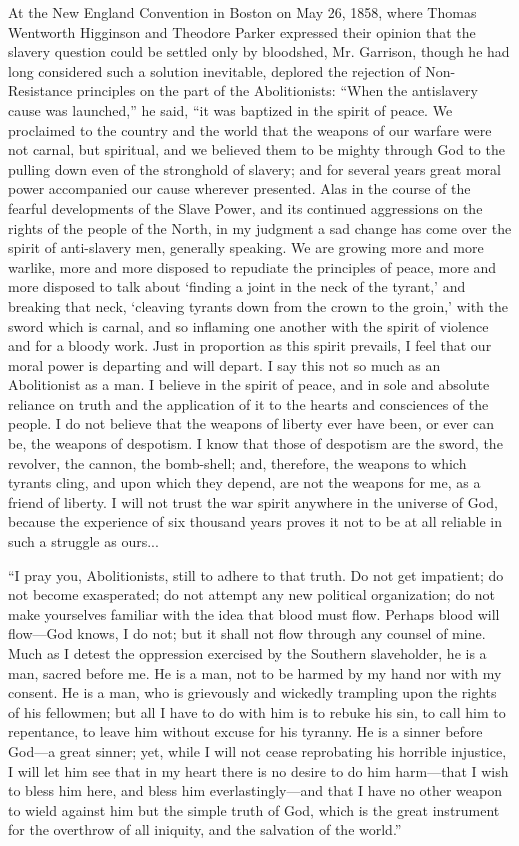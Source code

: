 \documentclass{book}
\begin{document}
At the New England Convention in Boston on May 26, 1858, where Thomas Wentworth Higginson and Theodore Parker expressed their opinion that the slavery question could be settled only by bloodshed, Mr. Garrison, though he had long considered such a solution inevitable, deplored the rejection of Non-Resistance principles on the part of the Abolitionists: “When the antislavery cause was launched,” he said, “it was baptized in the spirit of peace. We proclaimed to the country and the world that the weapons of our warfare were not carnal, but spiritual, and we believed them to be mighty through God to the pulling down even of the stronghold of slavery; and for several years great moral power accompanied our cause wherever presented. Alas in the course of the fearful developments of the Slave Power, and its continued aggressions on the rights of the people of the North, in my judgment a sad change has come over the spirit of anti-slavery men, generally speaking. We are growing more and more warlike, more and more disposed to repudiate the principles of peace, more and more disposed to talk about ‘finding a joint in the neck of the tyrant,’ and breaking that neck, ‘cleaving tyrants down from the crown to the groin,’ with the sword which is carnal, and so inflaming one another with the spirit of violence and for a bloody work. Just in proportion as this spirit prevails, I feel that our moral power is departing and will depart. I say this not so much as an Abolitionist as a man. I believe in the spirit of peace, and in sole and absolute reliance on truth and the application of it to the hearts and consciences of the people. I do not believe that the weapons of liberty ever have been, or ever can be, the weapons of despotism. I know that those of despotism are the sword, the revolver, the cannon, the bomb-shell; and, therefore, the weapons to which tyrants cling, and upon which they depend, are not the weapons for me, as a friend of liberty. I will not trust the war spirit anywhere in the universe of God, because the experience of six thousand years proves it not to be at all reliable in such a struggle as ours...

“I pray you, Abolitionists, still to adhere to that truth. Do not get impatient; do not become exasperated; do not attempt any new political organization; do not make yourselves familiar with the idea that blood must flow. Perhaps blood will flow—God knows, I do not; but it shall not flow through any counsel of mine. Much as I detest the oppression exercised by the Southern slaveholder, he is a man, sacred before me. He is a man, not to be harmed by my hand nor with my consent. He is a man, who is grievously and wickedly trampling upon the rights of his fellowmen; but all I have to do with him is to rebuke his sin, to call him to repentance, to leave him without excuse for his tyranny. He is a sinner before God—a great sinner; yet, while I will not cease reprobating his horrible injustice, I will let him see that in my heart there is no desire to do him harm—that I wish to bless him here, and bless him everlastingly—and that I have no other weapon to wield against him but the simple truth of God, which is the great instrument for the overthrow of all iniquity, and the salvation of the world.”\footnotemark[10]
\end{document}
